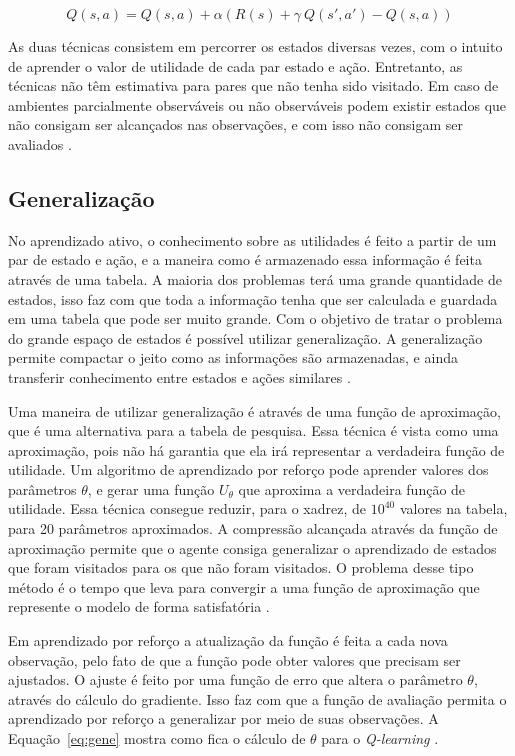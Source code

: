 \begin{equation}
\label{eq:sarsa}	
Q(s, a) = Q(s, a) + \alpha (R(s) + \gamma~Q(s', a') - Q(s, a))
\end{equation}


As duas técnicas consistem em percorrer os estados diversas vezes, com o intuito de aprender o valor de utilidade de cada par estado e ação. Entretanto, as técnicas não têm estimativa para pares que não tenha sido visitado. Em caso de ambientes parcialmente observáveis ou não observáveis podem existir estados que não consigam ser alcançados nas observações, e com isso não consigam ser avaliados \cite{Mitchell1997ML}.   


\subsection{Generalização} 
 
No aprendizado ativo, o conhecimento sobre as utilidades é feito a partir de um par de estado e ação, e a maneira como é armazenado essa informação é feita através de uma tabela. A maioria dos problemas terá uma grande quantidade de estados, isso faz com que toda a informação tenha que ser calculada e guardada em uma tabela que pode ser muito grande. Com o objetivo de tratar o problema do grande espaço de estados é possível utilizar generalização. A generalização permite compactar o jeito como as informações são armazenadas, e ainda transferir conhecimento entre estados e ações similares \cite{Mitchell1997ML, kaelbling1996reinforcement}.

Uma maneira de utilizar generalização é através de uma função de aproximação, que é uma alternativa para a tabela de pesquisa. Essa técnica é vista como uma aproximação, pois não há garantia que ela irá representar a verdadeira função de utilidade. Um algoritmo de aprendizado por reforço pode aprender valores dos parâmetros $\theta$, e gerar uma função $U_{\theta}$ que aproxima a verdadeira função de utilidade. Essa técnica consegue reduzir, para o xadrez, de $10^{40}$ valores na tabela, para 20 parâmetros aproximados. A compressão alcançada através da função de aproximação permite que o agente consiga generalizar o aprendizado de estados que foram visitados para os que não foram visitados. O problema desse tipo método é o tempo que leva para convergir a uma função de aproximação que represente o modelo de forma satisfatória \cite{intelligence2003modern}.

Em aprendizado por reforço a atualização da função é feita a cada nova observação, pelo fato de que a função pode obter valores que precisam ser ajustados. O ajuste é feito por uma função de erro que altera o parâmetro $\theta$, através do cálculo do gradiente. Isso faz com que a função de avaliação permita o aprendizado por reforço a generalizar por meio de suas observações. A Equação~\ref{eq:gene} mostra como fica o cálculo de $\theta$ para o \textit{Q-learning} \cite{intelligence2003modern}.

